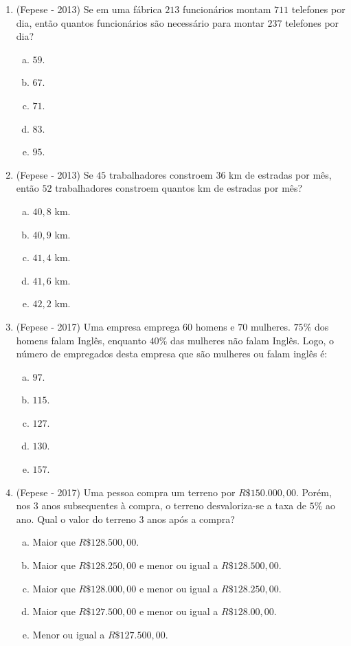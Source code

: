 \begin{enumerate}
 \item (Fepese - 2013) Se em uma fábrica $213$ funcionários montam $711$ telefones por dia, então quantos funcionários são necessário para montar $237$ telefones por dia?
 \begin{enumerate}[a)]
   \item $59$.
   \item $67$.
   \item $71$.
   \item $83$.
   \item $95$.
   \end{enumerate}

 \item (Fepese - 2013) Se $45$ trabalhadores constroem $36$ km de estradas por mês, então $52$ trabalhadores constroem quantos km de estradas por mês?
 \begin{enumerate}[a)]
   \item $40,8$ km.
   \item $40,9$ km.
   \item $41,4$ km.
   \item $41,6$ km.
   \item $42,2$ km.
   \end{enumerate}

  \item (Fepese - 2017) Uma empresa emprega $60$ homens e $70$ mulheres. $75\%$ dos homens falam Inglês, enquanto $40\%$ das mulheres não falam Inglês. Logo, o número de empregados desta empresa que são mulheres ou falam inglês é:
 \begin{enumerate}[a)]
   \item $97$.
   \item $115$.
   \item $127$.
   \item $130$.
   \item $157$.
   \end{enumerate}

   \item (Fepese - 2017) Uma pessoa compra um terreno por $R\$ 150.000,00$. Porém, nos $3$ anos subsequentes à compra, o terreno desvaloriza-se a taxa de $5\%$ ao ano. Qual o valor do terreno $3$ anos após a compra?
  \begin{enumerate}[a)]
   \item Maior que $R\$ 128.500,00$.
   \item Maior que $R\$ 128.250,00$ e menor ou igual a $R\$128.500,00$.
   \item Maior que $R\$ 128.000,00$ e menor ou igual a $R\$128.250,00$.
   \item Maior que $R\$ 127.500,00$ e menor ou igual a $R\$128.00,00$.
   \item Menor ou igual a $R\$ 127.500,00$.
   \end{enumerate}


\end{enumerate}

